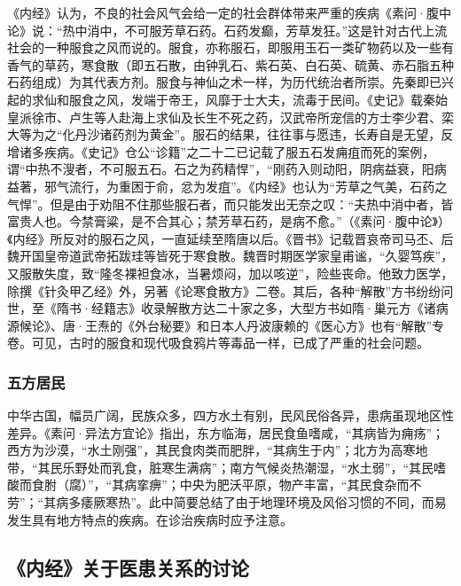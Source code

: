 \documentclass[12pt]{ctexbook}
\begin{document}
《内经》认为，不良的社会风气会给一定的社会群体带来严重的疾病《素问·腹中论》说：“热中消中，不可服芳草石药。石药发癫，芳草发狂。”这是针对古代上流社会的一种服食之风而说的。服食，亦称服石，即服用玉石一类矿物药以及一些有香气的草药，寒食散（即五石散，由钟乳石、紫石英、白石英、硫黄、赤石脂五种石药组成）为其代表方剂。服食与神仙之术一样，为历代统治者所崇。先秦即已兴起的求仙和服食之风，发端于帝王，风靡于士大夫，流毒于民间。《史记》载秦始皇派徐市、卢生等人赴海上求仙及长生不死之药，汉武帝所宠信的方士李少君、栾大等为之“化丹沙诸药剂为黄金”。服石的结果，往往事与愿违，长寿自是无望，反增诸多疾病。《史记》仓公“诊籍”之二十二已记载了服五石发痈疽而死的案例，谓“中热不溲者，不可服五石。石之为药精悍”，“刚药入则动阳，阴病益衰，阳病益著，邪气流行，为重困于俞，忿为发疽”。《内经》也认为“芳草之气美，石药之气悍”。但是由于劝阻不住那些服石者，而只能发出无奈之叹：“夫热中消中者，皆富贵人也。今禁膏粱，是不合其心；禁芳草石药，是病不愈。”（《素问·腹中论》）《内经》所反对的服石之风，一直延续至隋唐以后。《晋书》记载晋哀帝司马丕、后魏开国皇帝道武帝拓跋珪等皆死于寒食散。魏晋时期医学家皇甫谧，“久婴笃疾”，又服散失度，致“隆冬裸袒食冰，当暑烦闷，加以咳逆”，险些丧命。他致力医学，除撰《针灸甲乙经》外，另著《论寒食散方》二卷。其后，各种“解散”方书纷纷问世，至《隋书·经籍志》收录解散方达二十家之多，大型方书如隋·巢元方《诸病源候论》、唐·王焘的《外台秘要》和日本人丹波康赖的《医心方》也有“解散”专卷。可见，古时的服食和现代吸食鸦片等毒品一样，已成了严重的社会问题。

\subsubsection{五方居民}%

中华古国，幅员广阔，民族众多，四方水土有别，民风民俗各异，患病虽现地区性差异。《素问·异法方宜论》指出，东方临海，居民食鱼嗜咸，“其病皆为痈疡”；西方为沙漠，“水土刚强”，其民食肉类而肥胖，“其病生于内”；北方为高寒地带，“其民乐野处而乳食，脏寒生满病”；南方气候炎热潮湿，“水土弱”，“其民嗜酸而食胕（腐）”，“其病挛痹”；中央为肥沃平原，物产丰富，“其民食杂而不劳”；“其病多痿厥寒热”。此中简要总结了由于地理环境及风俗习惯的不同，而易发生具有地方特点的疾病。在诊治疾病时应予注意。

\subsection{《内经》关于医患关系的讨论}%
\end{document}
